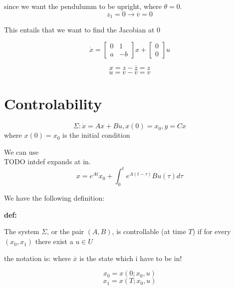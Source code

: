 \documentclass[a4paper]{article}
\begin{document}
since we want the pendulumm to be upright, where $ \theta = 0 $. 
\[
z_1 = 0 \rightarrow \overline{v} = 0
\] 

This entails that we want to find the Jacobian at 0

\hfill {}

\begin{equation} \label{eq3}
\dot{x} = \begin{bmatrix}
0 & 1 \\
a & -b
\end{bmatrix}x + \begin{bmatrix}
0 \\
0
\end{bmatrix} u
\end{equation}

\[
x = z - \overline{z} = z
\] 
\[
u = v - \overline{v} = v
\] 

\section{Controlability}
\begin{equation}
\Sigma: \dot{x} = Ax + Bu, x(0) = x_0, y = Cx
\end{equation}
where $ x(0) = x_0 $ is the initial condition

We can use \\
TODO intdef expands at in.
 \begin{equation}
	 x = e^{At}x_0 + \int_{0}^{t}e^{A(t-\tau)} Bu(\tau) d\tau
\end{equation}


We have the following definition:

\vspace{5pt}

\textbf{def:} 

The system $\Sigma$, or the pair $ (A,B)$, is controllable (at time $ T $) if for every  $ (x_0,x_1) $ there exist a $ u \in U $

the notation is:
where $ \overline{x} $ is the state which i have to be in!



\begin{equation}
x_0 = x(0; x_0, u)
\end{equation}
\begin{equation}
x_1 = x(T; x_0, u)
\end{equation}
\end{document}
